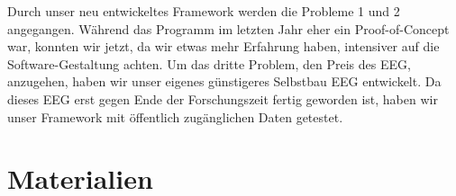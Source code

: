 \documentclass[10pt]{article}
\begin{document}
Durch unser neu entwickeltes Framework werden die Probleme 1 und 2 angegangen. Während das Programm im letzten Jahr eher ein Proof-of-Concept war, konnten wir jetzt, da wir etwas mehr Erfahrung haben, intensiver auf die Software-Gestaltung achten.
Um das dritte Problem, den Preis des EEG, anzugehen, haben wir unser eigenes günstigeres Selbstbau EEG entwickelt.
Da dieses EEG erst gegen Ende der Forschungszeit fertig geworden ist, haben wir unser Framework mit öffentlich zugänglichen Daten getestet. 

\newpage %

\section{Materialien} \label{Materialien}
\end{document}
